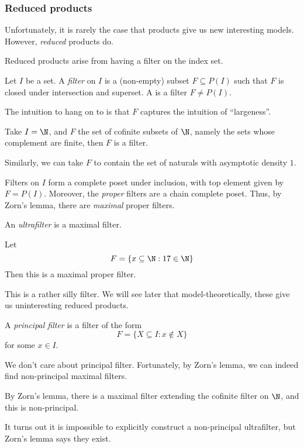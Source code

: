 \documentclass[a4paper]{article}
\begin{document}
\subsubsection*{Reduced products}
Unfortunately, it is rarely the case that products give us new interesting models. However, \emph{reduced} products do.

Reduced products arise from having a filter on the index set.
\begin{defi}[Filter]
  Let $I$ be a set. A \emph{filter} on $I$ is a (non-empty) subset $F \subseteq P(I)$ such that $F$ is closed under intersection and superset. A  is a filter $F \not= P(I)$.
\end{defi}

The intuition to hang on to is that $F$ captures the intuition of ``largeness''.
\begin{eg}
  Take $I = \N$, and $F$ the set of cofinite subsets of $\N$, namely the sets whose complement are finite, then $F$ is a filter.

  Similarly, we can take $F$ to contain the set of naturals with asymptotic density $1$.
\end{eg}

Filters on $I$ form a complete poset under inclusion, with top element given by $F = P(I)$. Moreover, the \emph{proper} filters are a chain complete poset. Thus, by Zorn's lemma, there are \emph{maximal} proper filters.
\begin{defi}[Ultrafilter]
  An \emph{ultrafilter} is a maximal filter.
\end{defi}

\begin{eg}
  Let
  \[
    F = \{x \subseteq \N: 17 \in \N\}
  \]
  Then this is a maximal proper filter.
\end{eg}
This is a rather silly filter. We will see later that model-theoretically, these give us uninteresting reduced products.

\begin{defi}
  A \emph{principal filter} is a filter of the form
  \[
    F = \{X \subseteq I: x \not\in X\}
  \]
  for some $x \in I$.
\end{defi}
We don't care about principal filter. Fortunately, by Zorn's lemma, we can indeed find non-principal maximal filters.
\begin{eg}
  By Zorn's lemma, there is a maximal filter extending the cofinite filter on $\N$, and this is non-principal.
\end{eg}
It turns out it is impossible to explicitly construct a non-principal ultrafilter, but Zorn's lemma says they exist.
\end{document}
